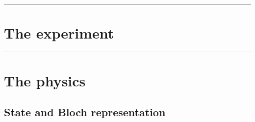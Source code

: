 \documentclass[12pt,a4paper]{article}
\begin{document}
\noindent\rule{\textwidth}{0.4pt}
\FloatBarrier

\section{The experiment}
\label{sec:the-experiment}
%

\noindent\rule{\textwidth}{0.4pt}
\FloatBarrier

\section{The physics}
\label{sec:the-physics}

\subsection{State and Bloch representation}
\label{sec:state-and-bloch-representation}
%
\end{document}
